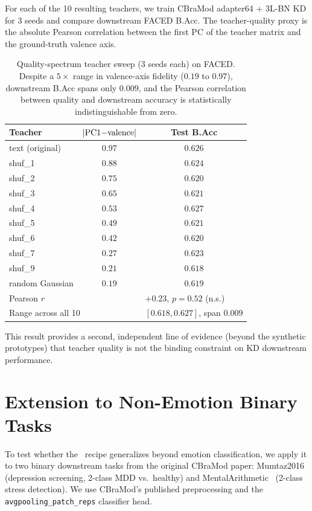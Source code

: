 For each of the 10 resulting teachers, we train CBraMod adapter64 + 3L-BN KD for 3 seeds and compare downstream FACED B.Acc. The teacher-quality proxy is the absolute Pearson correlation between the first PC of the teacher matrix and the ground-truth valence axis.

\begin{table}[!h]
\caption{Quality-spectrum teacher sweep (3 seeds each) on FACED. Despite a $5\times$ range in valence-axis fidelity ($0.19$ to $0.97$), downstream B.Acc spans only $0.009$, and the Pearson correlation between quality and downstream accuracy is statistically indistinguishable from zero.}
\small
\centering
\begin{tabular}{lcc}
\toprule
Teacher & $|{\rm PC1}{-}{\rm valence}|$ & Test B.Acc \\
\midrule
text (original) & $0.97$ & $0.626$ \\
shuf\_1 & $0.88$ & $0.624$ \\
shuf\_2 & $0.75$ & $0.620$ \\
shuf\_3 & $0.65$ & $0.621$ \\
shuf\_4 & $0.53$ & $0.627$ \\
shuf\_5 & $0.49$ & $0.621$ \\
shuf\_6 & $0.42$ & $0.620$ \\
shuf\_7 & $0.27$ & $0.623$ \\
shuf\_9 & $0.21$ & $0.618$ \\
random Gaussian & $0.19$ & $0.619$ \\
\midrule
\multicolumn{2}{l}{Pearson $r$} & \multicolumn{1}{l}{$+0.23$, $p = 0.52$ (n.s.)} \\
\multicolumn{2}{l}{Range across all 10} & \multicolumn{1}{l}{$[0.618, 0.627]$, span $0.009$} \\
\bottomrule
\end{tabular}
\label{tab:supp_qspec}
\end{table}

This result provides a second, independent line of evidence (beyond the synthetic prototypes) that teacher quality is not the binding constraint on KD downstream performance.

\section{Extension to Non-Emotion Binary Tasks}
\label{sec:supp_binary}

To test whether the \ours\ recipe generalizes beyond emotion classification, we apply it to two binary downstream tasks from the original CBraMod paper: Mumtaz2016~\cite{mumtaz2016dataset} (depression screening, 2-class MDD vs.\ healthy) and MentalArithmetic~\cite{goldberger2000physionet} (2-class stress detection). We use CBraMod's published preprocessing and the \texttt{avgpooling\_patch\_reps} classifier head.

